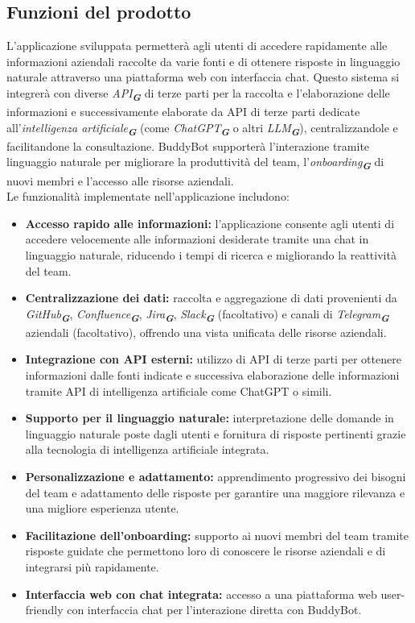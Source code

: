 \subsection{Funzioni del prodotto}
L'applicazione sviluppata permetterà agli utenti di accedere rapidamente alle informazioni aziendali raccolte da varie 
fonti e di ottenere risposte in linguaggio naturale attraverso una piattaforma web con interfaccia chat. Questo sistema 
si integrerà con diverse \emph{API}\textsubscript{\textit{\textbf{G}}}  di terze parti per la raccolta e l'elaborazione delle informazioni e successivamente elaborate
da API  di terze parti dedicate all'\emph{intelligenza artificiale}\textsubscript{\textit{\textbf{G}}}  (come \emph{ChatGPT}\textsubscript{\textit{\textbf{G}}} o altri \emph{LLM}\textsubscript{\textit{\textbf{G}}}), centralizzandole e facilitandone la consultazione. 
BuddyBot supporterà l'interazione tramite linguaggio naturale per migliorare la produttività del team, l'\emph{onboarding}\textsubscript{\textit{\textbf{G}}} di nuovi 
membri e l'accesso alle risorse aziendali.\\
Le funzionalità implementate nell'applicazione includono:
\begin{itemize}
    \item \textbf{Accesso rapido alle informazioni:} l'applicazione consente agli utenti di accedere velocemente alle informazioni desiderate tramite una chat in linguaggio naturale, riducendo i tempi di ricerca e migliorando la reattività del team.
    \item \textbf{Centralizzazione dei dati:} raccolta e aggregazione di dati provenienti da \emph{GitHub}\textsubscript{\textit{\textbf{G}}}, \emph{Confluence}\textsubscript{\textit{\textbf{G}}}, \emph{Jira}\textsubscript{\textit{\textbf{G}}}, \emph{Slack}\textsubscript{\textit{\textbf{G}}} (facoltativo) e canali di \emph{Telegram}\textsubscript{\textit{\textbf{G}}} aziendali (facoltativo), offrendo una vista unificata delle risorse aziendali.
    \item \textbf{Integrazione con API esterni:} utilizzo di API di terze parti per ottenere informazioni dalle fonti indicate e successiva elaborazione delle informazioni tramite API di intelligenza artificiale come ChatGPT o simili.
    \item \textbf{Supporto per il linguaggio naturale:} interpretazione delle domande in linguaggio naturale poste dagli utenti e fornitura di risposte pertinenti grazie alla tecnologia di intelligenza artificiale integrata.
    \item \textbf{Personalizzazione e adattamento:} apprendimento progressivo dei bisogni del team e adattamento delle risposte per garantire una maggiore rilevanza e una migliore esperienza utente.
    \item \textbf{Facilitazione dell'onboarding:} supporto ai nuovi membri del team tramite risposte guidate che permettono loro di conoscere le risorse aziendali e di integrarsi più rapidamente.
    \item \textbf{Interfaccia web con chat integrata:} accesso a una piattaforma web user-friendly con interfaccia chat per l'interazione diretta con BuddyBot.
\end{itemize}

